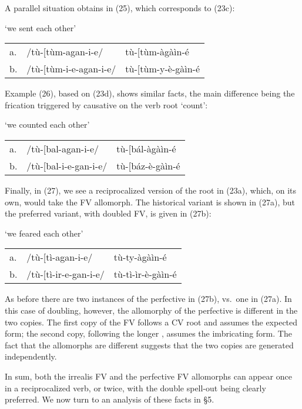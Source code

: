 \documentclass[output=paper,
modfonts
]{LSP/langsci}
\begin{document}
\noindent A parallel situation obtains in (25), which corresponds to (23c):

\ea `we sent each other'\\
\begin{tabular}{@{}lll}
a. & /tù-{[}tùm-agan-i-e/ & tù-{[}tùm-àgàìn-é \\
b. & /tù-{[}tùm-i-e-agan-i-e/ & tù-{[}tùm-y-è-gàìn-é \\
\end{tabular}
\z

\noindent Example (26), based on (23d), shows similar facts, the main difference
being the frication triggered by causative  on the verb root
 `count':

\ea `we counted each other'\\
\begin{tabular}{@{}lll}
a. & /tù-{[}bal-agan-i-e/ & tù-{[}bál-àgàìn-é \\
b. & /tù-{[}bal-i-e-gan-i-e/ & tù-{[}báz-è-gàìn-é \\
\end{tabular}
\z

\noindent Finally, in (27), we see a reciprocalized version of the root in (23a),
which, on its own, would take the  FV allomorph. The
historical variant is shown in (27a), but the preferred variant, with
doubled FV, is given in (27b):

\ea `we feared each other'\\
\begin{tabular}{@{}lll}
a. & /tù-{[}tì-agan-i-e/ & tù-ty-àgàìn-é \\
b. & /tù-{[}tì-ir-e-gan-i-e/ & tù-tì-ìr-è-gàìn-é \\
\end{tabular}
\z

\noindent As before there are two instances of the perfective in (27b), vs.\ one in
(27a). In this case of doubling, however, the allomorphy of the
perfective is different in the two copies. The first copy of the FV
follows a CV root and assumes the expected  form; the second
copy, following the longer , assumes the imbricating
 form. The fact that the allomorphs are different suggests
that the two copies are generated independently.

In sum, both the irrealis  FV and the perfective FV allomorphs
can appear once in a reciprocalized verb, or twice, with the double
spell-out being clearly preferred. We now turn to an analysis of these
facts in §5.
\end{document}
